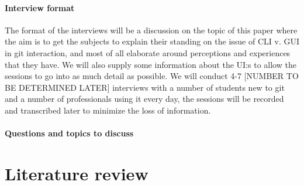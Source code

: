 \documentclass[12pt,a4paper,article,compsoc]{IEEEtran}
\begin{document}
					\paragraph*{Interview format}
					The format of the interviews will be a discussion on the topic of this paper where the aim is to get the subjects to explain their standing on the issue of CLI v. GUI in git interaction, and most of all elaborate around perceptions and experiences that they have. We will also supply some information about the UI:s to allow the sessions to go into as much detail as possible. 
					We will conduct 4-7 [NUMBER TO BE DETERMINED LATER] interviews with a number of students new to git and a number of professionals using it every day, the sessions will be recorded and transcribed later to minimize the loss of information.
					
					\paragraph*{Questions and topics to discuss}
		
		\section{Literature review}
		
\end{document}
